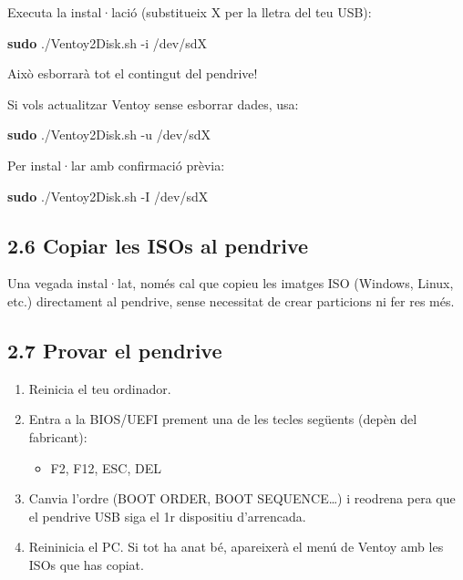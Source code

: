 \documentclass[
  spanish,
  12 pt,
  a4paper,
]{article}
\newenvironment{Shaded}{\begin{snugshade}}{\end{snugshade}}
\newcommand{\AttributeTok}[1]{\textcolor[rgb]{0.13,0.29,0.53}{#1}}
\newcommand{\FunctionTok}[1]{\textcolor[rgb]{0.13,0.29,0.53}{\textbf{#1}}}
\newcommand{\NormalTok}[1]{#1}
\providecommand{\tightlist}{%
  \setlength{\itemsep}{0pt}\setlength{\parskip}{0pt}}
\begin{document}
Executa la instal·lació (substitueix X per la lletra del teu USB):

\begin{Shaded}
\begin{Highlighting}[]
\FunctionTok{sudo}\NormalTok{ ./Ventoy2Disk.sh }\AttributeTok{{-}i}\NormalTok{ /dev/sdX}
\end{Highlighting}
\end{Shaded}

Això esborrarà tot el contingut del pendrive!

Si vols actualitzar Ventoy sense esborrar dades, usa:

\begin{Shaded}
\begin{Highlighting}[]
\FunctionTok{sudo}\NormalTok{ ./Ventoy2Disk.sh }\AttributeTok{{-}u}\NormalTok{ /dev/sdX}
\end{Highlighting}
\end{Shaded}

Per instal·lar amb confirmació prèvia:

\begin{Shaded}
\begin{Highlighting}[]
\FunctionTok{sudo}\NormalTok{ ./Ventoy2Disk.sh }\AttributeTok{{-}I}\NormalTok{ /dev/sdX}
\end{Highlighting}
\end{Shaded}

\subsection{2.6 Copiar les ISOs al
pendrive}\label{copiar-les-isos-al-pendrive}

Una vegada instal·lat, només cal que copieu les imatges ISO (Windows,
Linux, etc.) directament al pendrive, sense necessitat de crear
particions ni fer res més.

\subsection{2.7 Provar el pendrive}\label{provar-el-pendrive}

\begin{enumerate}
\def\labelenumi{\arabic{enumi}.}
\tightlist
\item
  Reinicia el teu ordinador.\\
\item
  Entra a la BIOS/UEFI prement una de les tecles següents (depèn del
  fabricant):

  \begin{itemize}
  \tightlist
  \item
    F2, F12, ESC, DEL\\
  \end{itemize}
\item
  Canvia l'ordre (BOOT ORDER, BOOT SEQUENCE\ldots) i reodrena pera que
  el pendrive USB siga el 1r dispositiu d'arrencada.
\item
  Reininicia el PC. Si tot ha anat bé, apareixerà el menú de Ventoy amb
  les ISOs que has copiat.
\end{enumerate}
\end{document}
